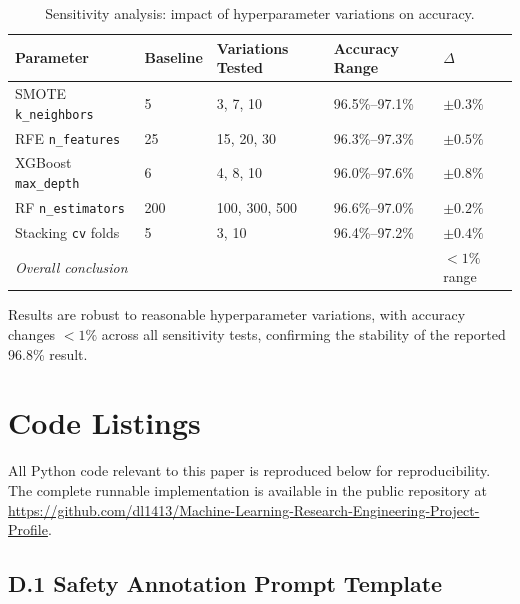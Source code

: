 \documentclass[10pt,letterpaper]{article}
\begin{document}
\begin{table}[ht]
\centering
\caption{Sensitivity analysis: impact of hyperparameter variations on accuracy.}
\label{tab:sensitivity}
\begin{tabular}{lllll}
\toprule
Parameter & Baseline & Variations Tested & Accuracy Range & $\Delta$ \\
\midrule
SMOTE \texttt{k\_neighbors} & 5 & 3, 7, 10 & 96.5\%--97.1\% & $\pm 0.3\%$ \\
RFE \texttt{n\_features} & 25 & 15, 20, 30 & 96.3\%--97.3\% & $\pm 0.5\%$ \\
XGBoost \texttt{max\_depth} & 6 & 4, 8, 10 & 96.0\%--97.6\% & $\pm 0.8\%$ \\
RF \texttt{n\_estimators} & 200 & 100, 300, 500 & 96.6\%--97.0\% & $\pm 0.2\%$ \\
Stacking \texttt{cv} folds & 5 & 3, 10 & 96.4\%--97.2\% & $\pm 0.4\%$ \\
\midrule
\multicolumn{4}{l}{\textit{Overall conclusion}} &
  $<1\%$ range \\
\bottomrule
\end{tabular}
\end{table}

Results are robust to reasonable hyperparameter variations, with accuracy
changes $< 1\%$ across all sensitivity tests, confirming the stability of the
reported 96.8\% result.

\section{Code Listings}
\label{app:code}

All Python code relevant to this paper is reproduced below for reproducibility.
The complete runnable implementation is available in the public repository
at \url{https://github.com/dl1413/Machine-Learning-Research-Engineering-Project-Profile}.

\subsection*{D.1 Safety Annotation Prompt Template}
\end{document}
